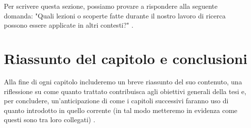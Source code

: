 \medskip

Per scrivere questa sezione, possiamo provare a rispondere alla seguente domanda: "Quali lezioni o scoperte fatte durante il nostro lavoro di ricerca possono essere applicate in altri contesti?" \cite{mannisto2022guide}.

\section{Riassunto del capitolo e conclusioni}

Alla fine di ogni capitolo includeremo un breve riassunto del suo contenuto, una riflessione su come quanto trattato contribuisca agli obiettivi generali della tesi e, per concludere, un'anticipazione di come i capitoli successivi faranno uso di quanto introdotto in quello corrente (in tal modo metteremo in evidenza come questi sono tra loro collegati) \cite{zobel2015writing}.
